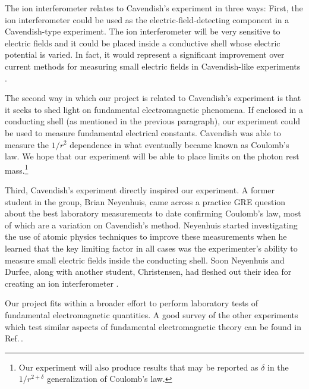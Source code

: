 The ion interferometer relates to Cavendish's experiment in three ways: First, the ion interferometer could be used as the electric-field-detecting component in a Cavendish-type experiment. The ion interferometer will be very sensitive to electric fields and it could be placed inside a conductive shell whose electric potential is varied. In fact, it would represent a significant improvement over current methods for measuring small electric fields in Cavendish-like experiments \cite{NSFprop}. 

The second way in which our project is related to Cavendish's experiment is that it seeks to shed light on fundamental electromagnetic phenomena. If enclosed in a conducting shell (as mentioned in the previous paragraph), our experiment could be used to measure fundamental electrical constants. Cavendish was able to measure the $1/r^2$ dependence in what eventually became known as Coulomb's law. We hope that our experiment will be able to place limits on the photon rest mass.\footnote{Our experiment will also produce results that may be reported as $\delta$ in the $1/r^{2+\delta}$ generalization of Coulomb's law.}

Third, Cavendish's experiment directly inspired our experiment.
A former student in the group, Brian Neyenhuis, came across a practice GRE question
about the best laboratory measurements to date confirming Coulomb's law, most of which are a variation on Cavendish's method. 
Neyenhuis started investigating the use of atomic physics techniques to improve these measurements when he learned that the key limiting factor in all cases was the experimenter's ability to measure small electric fields inside the conducting shell. Soon Neyenhuis and Durfee, along with another student, Christensen, had fleshed out their idea for creating an ion interferometer \cite{christensen_arxiv_calcs} \cite{NeyenhuisIon}.  

Our project fits within a broader effort to perform laboratory tests of fundamental electromagnetic quantities. A good survey of the other experiments which test similar aspects of fundamental electromagnetic theory can be found in Ref.\,\cite{PhotonMassSurvey}. 

